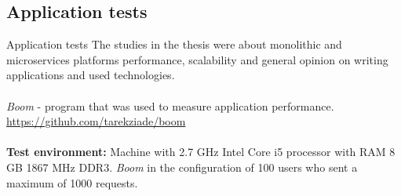 \documentclass{beamer}
\begin{document}
	\subsection{Application tests}
	\begin{frame}{Application tests}
		The studies in the thesis were about monolithic and microservices platforms performance, scalability and general opinion on writing applications and used technologies.\\
		~\\
		\textit{Boom} - program that was used to measure application performance. \url{https://github.com/tarekziade/boom} \\
		~\\
		\textbf{Test environment:}
		Machine with 2.7 GHz Intel Core i5 processor with RAM 8 GB 1867 MHz DDR3. \textit{Boom} in the configuration of 100 users who sent a maximum of 1000 requests.
	\end{frame}
	
\end{document}
